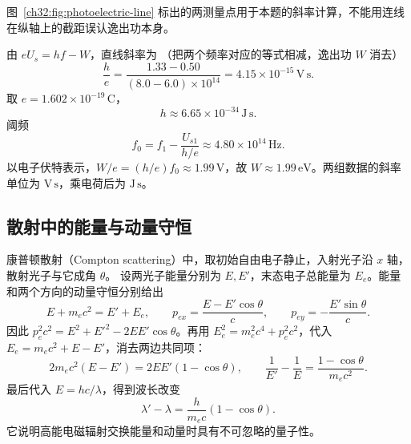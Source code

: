 \begin{xesolution}
\begin{center}\begin{minipage}{\linewidth}\centering\raggedright\ModernAnswerLabel\par\smallskip\centering
{}
\end{minipage}\end{center}
图~\ref{ch32:fig:photoelectric-line} 标出的两测量点用于本题的斜率计算，不能用连线在纵轴上的截距误认逸出功本身。


由 $eU_s=hf-W$，直线斜率为
（把两个频率对应的等式相减，逸出功 $W$ 消去）
\[
 \frac he=\frac{1.33-0.50}{(8.0-6.0)\times10^{14}}
 =4.15\times10^{-15}\,\mathrm{V\,s}.
\]
取 $e=1.602\times10^{-19}\,\mathrm C$，
\[
 \boxed{h\approx6.65\times10^{-34}\,\mathrm{J\,s}}.
\]
阈频
\[
 f_0=f_1-\frac{U_{s1}}{h/e}
 \approx\boxed{4.80\times10^{14}\,\mathrm{Hz}}.
\]
以电子伏特表示，$W/e=(h/e)f_0\approx1.99\,\mathrm V$，故
$\boxed{W\approx1.99\,\mathrm{eV}}$。两组数据的斜率单位为 $\mathrm{V\,s}$，乘电荷后为 $\mathrm{J\,s}$。
\end{xesolution}

\subsection{散射中的能量与动量守恒}
康普顿散射（Compton scattering）中，取初始自由电子静止，入射光子沿 $x$ 轴，散射光子与它成角 $\theta$。
设两光子能量分别为 $E,E'$，末态电子总能量为 $E_e$。能量和两个方向的动量守恒分别给出
\[
 E+m_ec^2=E'+E_e,\qquad p_{ex}=\frac{E-E'\cos\theta}{c},\qquad
 p_{ey}=-\frac{E'\sin\theta}{c}.
\]
因此 $p_e^2c^2=E^2+E'^2-2EE'\cos\theta$。再用 $E_e^2=m_e^2c^4+p_e^2c^2$，代入 $E_e=m_ec^2+E-E'$，消去两边共同项：
\[
 2m_ec^2(E-E')=2EE'(1-\cos\theta),\qquad
 \frac1{E'}-\frac1E=\frac{1-\cos\theta}{m_ec^2}.
\]
最后代入 $E=hc/\lambda$，得到波长改变
\begin{equation}
 \lambda'-\lambda=\frac{h}{m_ec}(1-\cos\theta).
\end{equation}
它说明高能电磁辐射交换能量和动量时具有不可忽略的量子性。

